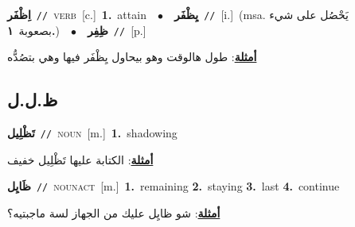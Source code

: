 \documentclass[10pt,a4paper,twoside]{article} %
\begin{document}
\begin{multicols}{2}
{{{\setlength\topsep{0pt}\textbf{\foreignlanguage{arabic}{اِظْفَر}}\ {\color{gray}\texttt{//}\color{black}}\ \textsc{verb}\ [c.]\ \textbf{1.}~attain\ \ $\bullet$\ \ \setlength\topsep{0pt}\textbf{\foreignlanguage{arabic}{يِظْفَر}}\ {\color{gray}\texttt{//}\color{black}}\ [i.]\ \color{gray}(msa. \foreignlanguage{arabic}{يَحْصُل على شيء بصعوبة}~\foreignlanguage{arabic}{\textbf{١.}})\color{black}\ \ $\bullet$\ \ \setlength\topsep{0pt}\textbf{\foreignlanguage{arabic}{ظِفِر}}\ {\color{gray}\texttt{//}\color{black}}\ [p.]\  \begin{flushright}\color{gray}\foreignlanguage{arabic}{\textbf{\underline{\foreignlanguage{arabic}{أمثلة}}}: طول هالوقت وهو بيحاول يِظْفَر فيها وهي بتصُدُّه}\end{flushright}\color{black}} \vspace{2mm}

\vspace{-3mm}
\subsection*{\color{blue}\foreignlanguage{arabic}{ظ.ل.ل}\color{blue}{}} 

{\setlength\topsep{0pt}\textbf{\foreignlanguage{arabic}{تَظْلِيل}}\ {\color{gray}\texttt{//}\color{black}}\ \textsc{noun}\ [m.]\ \textbf{1.}~shadowing\  \begin{flushright}\color{gray}\foreignlanguage{arabic}{\textbf{\underline{\foreignlanguage{arabic}{أمثلة}}}: الكتابة عليها تَظْلِيل خفيف}\end{flushright}\color{black}} \vspace{2mm}

{\setlength\topsep{0pt}\textbf{\foreignlanguage{arabic}{ظَايِل}}\ {\color{gray}\texttt{//}\color{black}}\ \textsc{noun\textunderscore act}\ [m.]\ \textbf{1.}~remaining  \textbf{2.}~staying  \textbf{3.}~last  \textbf{4.}~continue\  \begin{flushright}\color{gray}\foreignlanguage{arabic}{\textbf{\underline{\foreignlanguage{arabic}{أمثلة}}}: شو ظايِل عليك من الجهاز لسة ماجبتيه؟}\end{flushright}\color{black}} \vspace{2mm}

}}
\end{multicols}
\end{document}

